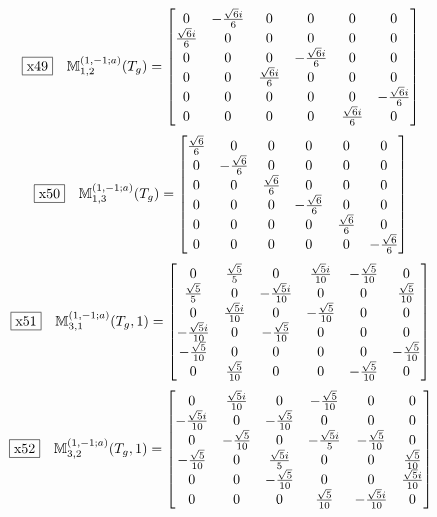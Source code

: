 \documentclass[fleqn,10pt,landscape]{jsarticle}
\begin{document}
\begin{dmath*}
\fbox{x49}\quad \mathbb{M}_{1,2}^{(1,-1;a)}(T_{g})=\begin{bmatrix} 0 & - \frac{\sqrt{6} i}{6} & 0 & 0 & 0 & 0 \\ \frac{\sqrt{6} i}{6} & 0 & 0 & 0 & 0 & 0 \\ 0 & 0 & 0 & - \frac{\sqrt{6} i}{6} & 0 & 0 \\ 0 & 0 & \frac{\sqrt{6} i}{6} & 0 & 0 & 0 \\ 0 & 0 & 0 & 0 & 0 & - \frac{\sqrt{6} i}{6} \\ 0 & 0 & 0 & 0 & \frac{\sqrt{6} i}{6} & 0 \end{bmatrix}
\end{dmath*}
\begin{dmath*}
\fbox{x50}\quad \mathbb{M}_{1,3}^{(1,-1;a)}(T_{g})=\begin{bmatrix} \frac{\sqrt{6}}{6} & 0 & 0 & 0 & 0 & 0 \\ 0 & - \frac{\sqrt{6}}{6} & 0 & 0 & 0 & 0 \\ 0 & 0 & \frac{\sqrt{6}}{6} & 0 & 0 & 0 \\ 0 & 0 & 0 & - \frac{\sqrt{6}}{6} & 0 & 0 \\ 0 & 0 & 0 & 0 & \frac{\sqrt{6}}{6} & 0 \\ 0 & 0 & 0 & 0 & 0 & - \frac{\sqrt{6}}{6} \end{bmatrix}
\end{dmath*}
\begin{dmath*}
\fbox{x51}\quad \mathbb{M}_{3,1}^{(1,-1;a)}(T_{g},1)=\begin{bmatrix} 0 & \frac{\sqrt{5}}{5} & 0 & \frac{\sqrt{5} i}{10} & - \frac{\sqrt{5}}{10} & 0 \\ \frac{\sqrt{5}}{5} & 0 & - \frac{\sqrt{5} i}{10} & 0 & 0 & \frac{\sqrt{5}}{10} \\ 0 & \frac{\sqrt{5} i}{10} & 0 & - \frac{\sqrt{5}}{10} & 0 & 0 \\ - \frac{\sqrt{5} i}{10} & 0 & - \frac{\sqrt{5}}{10} & 0 & 0 & 0 \\ - \frac{\sqrt{5}}{10} & 0 & 0 & 0 & 0 & - \frac{\sqrt{5}}{10} \\ 0 & \frac{\sqrt{5}}{10} & 0 & 0 & - \frac{\sqrt{5}}{10} & 0 \end{bmatrix}
\end{dmath*}
\begin{dmath*}
\fbox{x52}\quad \mathbb{M}_{3,2}^{(1,-1;a)}(T_{g},1)=\begin{bmatrix} 0 & \frac{\sqrt{5} i}{10} & 0 & - \frac{\sqrt{5}}{10} & 0 & 0 \\ - \frac{\sqrt{5} i}{10} & 0 & - \frac{\sqrt{5}}{10} & 0 & 0 & 0 \\ 0 & - \frac{\sqrt{5}}{10} & 0 & - \frac{\sqrt{5} i}{5} & - \frac{\sqrt{5}}{10} & 0 \\ - \frac{\sqrt{5}}{10} & 0 & \frac{\sqrt{5} i}{5} & 0 & 0 & \frac{\sqrt{5}}{10} \\ 0 & 0 & - \frac{\sqrt{5}}{10} & 0 & 0 & \frac{\sqrt{5} i}{10} \\ 0 & 0 & 0 & \frac{\sqrt{5}}{10} & - \frac{\sqrt{5} i}{10} & 0 \end{bmatrix}
\end{dmath*}
\end{document}
